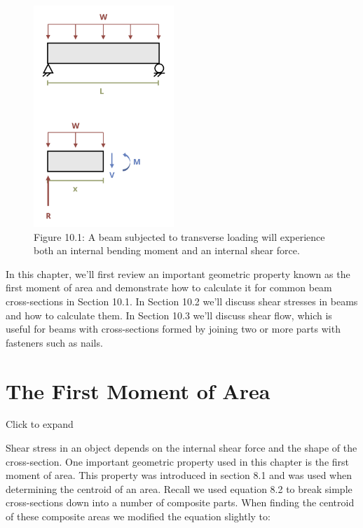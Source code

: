 \documentclass[
  letterpaper,
  DIV=11,
  numbers=noendperiod]{scrreprt}
\theoremstyle{definition}
\theoremstyle{remark}
\begin{document}
\begin{figure}[H]

{\centering \includegraphics[width=2.08333in,height=\textheight]{images/CH10 PNGs/figure 10.1.png}

}

\caption{Figure 10.1: A beam subjected to transverse loading will
experience both an internal bending moment and an internal shear force.}

\end{figure}%

In this chapter, we'll first review an important geometric property
known as the first moment of area and demonstrate how to calculate it
for common beam cross-sections in Section 10.1. In Section 10.2 we'll
discuss shear stresses in beams and how to calculate them. In Section
10.3 we'll discuss shear flow, which is useful for beams with
cross-sections formed by joining two or more parts with fasteners such
as nails.

\section{The First Moment of Area}\label{sec-10.1}

Click to expand

Shear stress in an object depends on the internal shear force and the
shape of the cross-section. One important geometric property used in
this chapter is the first moment of area. This property was introduced
in section 8.1 and was used when determining the centroid of an area.
Recall we used equation 8.2 to break simple cross-sections down into a
number of composite parts. When finding the centroid of these composite
areas we modified the equation slightly to:
\end{document}
